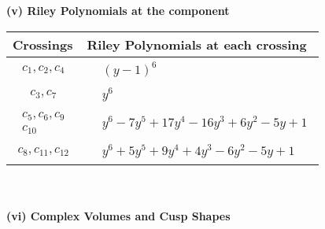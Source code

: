 \documentclass[1p]{elsarticle_modified}
\theoremstyle{definition}
\begin{document}
\newpage\renewcommand{\arraystretch}{1}
\flushleft \textbf{(v) Riley Polynomials at the component}\newline \\
\begin{tabular}{m{50pt}|m{274pt}}
Crossings & \hspace{64pt}Riley Polynomials at each crossing \\
\hline $$\begin{aligned}c_{1},c_{2},c_{4}\end{aligned}$$&$\begin{aligned}
&(y-1)^6
\end{aligned}$\\
\hline $$\begin{aligned}c_{3},c_{7}\end{aligned}$$&$\begin{aligned}
&y^6
\end{aligned}$\\
\hline $$\begin{aligned}c_{5},c_{6},c_{9}\\c_{10}\end{aligned}$$&$\begin{aligned}
&y^6-7 y^5+17 y^4-16 y^3+6 y^2-5 y+1
\end{aligned}$\\
\hline $$\begin{aligned}c_{8},c_{11},c_{12}\end{aligned}$$&$\begin{aligned}
&y^6+5 y^5+9 y^4+4 y^3-6 y^2-5 y+1
\end{aligned}$\\
\hline
\end{tabular}\\~\\
\newpage\flushleft \textbf{(vi) Complex Volumes and Cusp Shapes}
\end{document}
